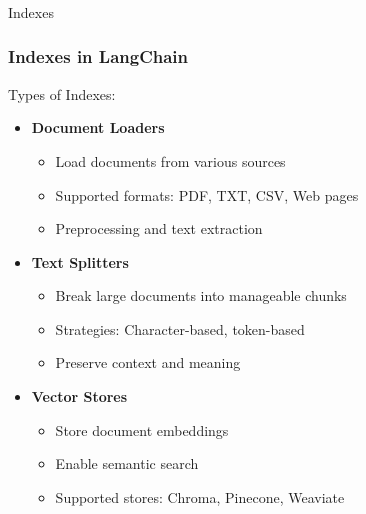 \begin{frame}[fragile]\frametitle{}
\begin{center}
{\Large Indexes}
\end{center}
\end{frame}

\begin{frame}\frametitle{Indexes in LangChain}

Types of Indexes:
\begin{itemize}
\item \textbf{Document Loaders}
    \begin{itemize}
    \item Load documents from various sources
    \item Supported formats: PDF, TXT, CSV, Web pages
    \item Preprocessing and text extraction
    \end{itemize}

\item \textbf{Text Splitters}
    \begin{itemize}
    \item Break large documents into manageable chunks
    \item Strategies: Character-based, token-based
    \item Preserve context and meaning
    \end{itemize}

\item \textbf{Vector Stores}
    \begin{itemize}
    \item Store document embeddings
    \item Enable semantic search
    \item Supported stores: Chroma, Pinecone, Weaviate
    \end{itemize}
\end{itemize}

\end{frame}

